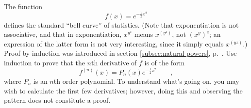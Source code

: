 The function
\begin{equation*}
  f(x) = e^{-\frac{1}{2}x^2}
\end{equation*}
defines the standard ``bell curve'' of statistics.
(Note that exponentiation is not associative,
and that in exponentiation, $x^{y^z}$ means $x^{(y^z)}$, not $(x^y)^z$; an expression of
the latter form is not very interesting, since it simply equals $x^{(yz)}$.)\\

Proof by induction was introduced in section \ref{subsec:natural-powers}, p.~\pageref{induction}.
Use induction to prove that the $n$th derivative of $f$ is of the form
\begin{equation*}
  f^{(n)}(x) = P_n(x)e^{-\frac{1}{2}x^2} \qquad ,
\end{equation*}
where $P_n$ is an $n$th order polynomial.
To understand what's going on, you may wish to calculate the first few derivatives; however,
doing this and observing the pattern does not constitute a proof.
